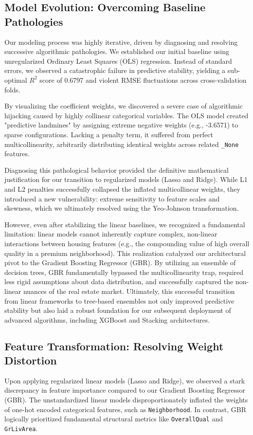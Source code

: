 \documentclass{article}
\begin{document}
\subsection{Model Evolution: Overcoming Baseline Pathologies}

Our modeling process was highly iterative, driven by diagnosing and resolving successive algorithmic pathologies. We established our initial baseline using unregularized Ordinary Least Squares (OLS) regression. Instead of standard errors, we observed a catastrophic failure in predictive stability, yielding a sub-optimal $R^2$ score of 0.6797 and violent RMSE fluctuations across cross-validation folds. 

By visualizing the coefficient weights, we discovered a severe case of algorithmic hijacking caused by highly collinear categorical variables. The OLS model created "predictive landmines" by assigning extreme negative weights (e.g., -3.6571) to sparse configurations. Lacking a penalty term, it suffered from perfect multicollinearity, arbitrarily distributing identical weights across related \texttt{\_None} features. 

Diagnosing this pathological behavior provided the definitive mathematical justification for our transition to regularized models (Lasso and Ridge). While L1 and L2 penalties successfully collapsed the inflated multicollinear weights, they introduced a new vulnerability: extreme sensitivity to feature scales and skewness, which we ultimately resolved using the Yeo-Johnson transformation. 

However, even after stabilizing the linear baselines, we recognized a fundamental limitation: linear models cannot inherently capture complex, non-linear interactions between housing features (e.g., the compounding value of high overall quality in a premium neighborhood). This realization catalyzed our architectural pivot to the Gradient Boosting Regressor (GBR). By utilizing an ensemble of decision trees, GBR fundamentally bypassed the multicollinearity trap, required less rigid assumptions about data distribution, and successfully captured the non-linear nuances of the real estate market. Ultimately, this successful transition from linear frameworks to tree-based ensembles not only improved predictive stability but also laid a robust foundation for our subsequent deployment of advanced algorithms, including XGBoost and Stacking architectures.


\subsection{Feature Transformation: Resolving Weight Distortion}
Upon applying regularized linear models (Lasso and Ridge), we observed a stark discrepancy in feature importance compared to our Gradient Boosting Regressor (GBR). The unstandardized linear models disproportionately inflated the weights of one-hot encoded categorical features, such as \texttt{Neighborhood}. In contrast, GBR logically prioritized fundamental structural metrics like \texttt{OverallQual} and \texttt{GrLivArea}.
\end{document}
